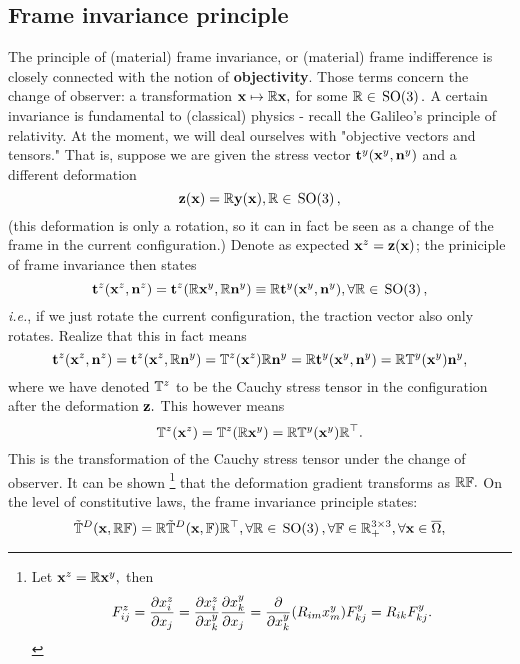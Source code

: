 \documentclass[11pt]{scrartcl} %
\begin{document}
\subsection{Frame invariance principle}
\label{sec:frame_invariance}
The principle of (material) frame invariance, or (material) frame indifference is closely connected with the notion of \textbf{objectivity}. Those terms concern the change of observer: a transformation $\vb{x} \mapsto \mathbb{R}\vb{x},$ for some $\mathbb{R} \in \, \text{SO(3)} \,.$ A certain invariance is fundamental to (classical) physics - recall the Galileo's principle of relativity. 
At the moment, we will deal ourselves with "objective vectors and tensors." That is, suppose we are given the stress vector $\vb{t}^{y}\qty(\vb{x}^{y}, \vb{n}^{y})$ and a different deformation
\[
	\vb{z}\qty(\vb{x}) = \mathbb{R} \vb{y}\qty(\vb{x}), \mathbb{R} \in \, \text{SO(3)} \,,
\]
(this deformation is only a rotation, so it can in fact be seen as a change of the frame in the current configuration.) Denote as expected $\vb{x}^z = \vb{z}(\vb{x})$; the priniciple of frame invariance then states
\[
	\vb{t}^z\qty(\vb{x}^z, \vb{n}^z) = \vb{t}^z\qty(\mathbb{R}\vb{x}^{y}, \mathbb{R}\vb{n}^{y}) \equiv \mathbb{R}\vb{t}^{y}\qty(\vb{x}^{y}, \vb{n}^{y}), \forall \mathbb{R} \in \, \text{SO(3)} \,,
\]
\textit{i.e.}, if we just rotate the current configuration, the traction vector also only rotates.
Realize that this in fact means
\[
	\vb{t}^z\qty(\vb{x}^z, \vb{n}^z) = \vb{t}^z\qty(\vb{x}^z, \mathbb{R}\vb{n}^y) = \mathbb{T}^z\qty(\vb{x}^z) \mathbb{R}\vb{n}^{y} = \mathbb{R}\vb{t}^{y}\qty(\vb{x}^{y}, \vb{n}^{y}) = \mathbb{R}\mathbb{T}^y\qty(\vb{x}^{y}) \vb{n}^{y},
\]
where we have denoted $\mathbb{T}^z$ to be the Cauchy stress tensor in the configuration after the deformation $\vb{z}.$ This however means
\[
	\mathbb{T}^z\qty(\vb{x}^{z}) = \mathbb{T}^z\qty(\mathbb{R}\vb{x}^{y}) =  \mathbb{R} \mathbb{T}^{y}\qty(\vb{x}^{y}) \mathbb{R}^\top.
\]
This is the transformation of the Cauchy stress tensor under the change of observer. It can be shown \footnote{Let $\vb{x}^z = \mathbb{R} \vb{x}^{y},$ then
	\[
		F^z_{ij} = \pdv{x^z_i}{x_j} = \pdv{x^z_i}{x^y_k}\pdv{x^y_k}{x_j} = \pdv{x^y_k}\qty(R_{im}x^{y}_m)F^y_{kj} = R_{ik} F^y_{kj}.
	\]
} that the deformation gradient transforms as $\mathbb{R}\mathbb{F}.$ On the level of constitutive laws, the frame invariance principle states:
\[
	\tilde{\mathbb{T}}^D\qty(\vb{x}, \mathbb{R} \mathbb{F}) = \mathbb{R}\tilde{\mathbb{T}}^D\qty(\vb{x},\mathbb{F})\mathbb{R}^\top, \forall \mathbb{R}\in \, \text{SO(3)} \,, \forall \mathbb{F} \in {\mathbb R}^{3 \times 3}_+, \forall \vb{x}\in \overline{\Omega},
\]
\end{document}
